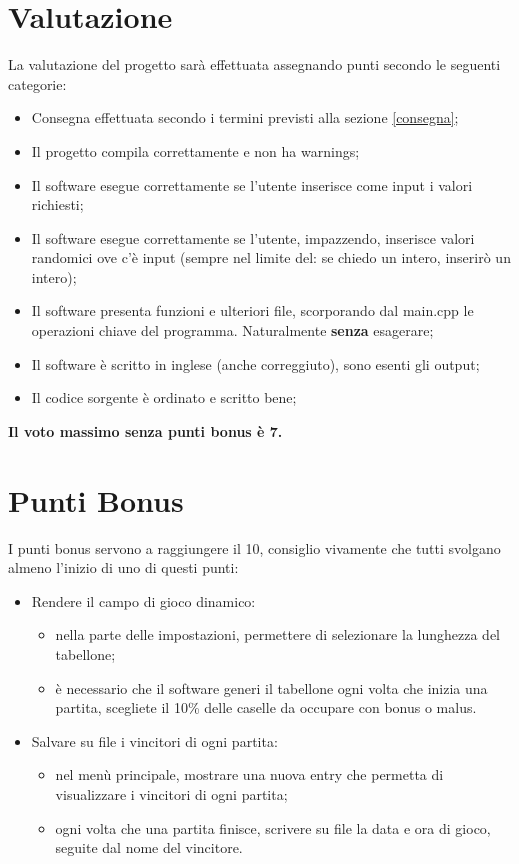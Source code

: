 \documentclass[addpoints]{exam}
\begin{document}
    \section{Valutazione}
    La valutazione del progetto sarà effettuata assegnando punti secondo le seguenti categorie:
    \begin{itemize}
        \item Consegna effettuata secondo i termini previsti alla sezione \ref{consegna};
        \item Il progetto compila correttamente e non ha warnings;
        \item Il software esegue correttamente se l'utente inserisce come input i valori richiesti;
        \item Il software esegue correttamente se l'utente, impazzendo, inserisce valori randomici ove c'è input (sempre nel limite del: se chiedo un intero, inserirò un intero);
        \item Il software presenta funzioni e ulteriori file, scorporando dal main.cpp le operazioni chiave del programma. Naturalmente \textbf{senza} esagerare;
        \item Il software è scritto in inglese (anche correggiuto), sono esenti gli output;
        \item Il codice sorgente è ordinato e scritto bene;
    \end{itemize}

    \begin{center}
        \Large\textbf{Il voto massimo senza punti bonus è 7.}
    \end{center}

    \section{Punti Bonus}
    \label{bonus_points}
    I punti bonus servono a raggiungere il 10, consiglio vivamente che tutti svolgano almeno l'inizio di uno di questi punti:
    \begin{itemize}
        \item Rendere il campo di gioco dinamico:
        \begin{itemize}
            \item nella parte delle impostazioni, permettere di selezionare la lunghezza del tabellone;
            \item è necessario che il software generi il tabellone ogni volta che inizia una partita, scegliete il 10\% delle caselle da occupare con bonus o malus. 
        \end{itemize}
        \item Salvare su file i vincitori di ogni partita:
        \begin{itemize}
            \item nel menù principale, mostrare una nuova entry che permetta di visualizzare i vincitori di ogni partita;
            \item ogni volta che una partita finisce, scrivere su file la data e ora di gioco, seguite dal nome del vincitore.
        \end{itemize}
    \end{itemize}
\end{document}

